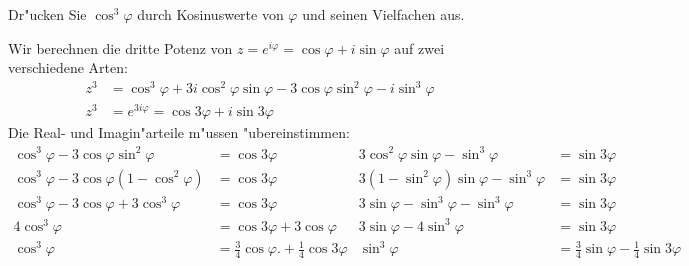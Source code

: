 Dr"ucken Sie $\cos^3\varphi$ durch Kosinuswerte von $\varphi$ und seinen
Vielfachen aus.

\begin{loesung}
Wir berechnen die dritte Potenz von $z=e^{i\varphi}=\cos\varphi+i\sin\varphi$
auf zwei verschiedene Arten:
\begin{align*}
z^3
&=
\cos^3\varphi + 3i\cos^2\varphi\sin\varphi - 3 \cos\varphi\sin^2\varphi
-i\sin^3\varphi
\\
z^3
&=
e^{3i\varphi}=\cos3\varphi+i\sin3\varphi
\end{align*}
Die Real- und Imagin"arteile m"ussen "ubereinstimmen:
\begin{align*}
\cos^3\varphi-3\cos\varphi\sin^2\varphi
&=
\cos3\varphi
&
3\cos^2\varphi\sin\varphi-\sin^3\varphi
&=
\sin3\varphi
\\
\cos^3\varphi-3\cos\varphi(1-\cos^2\varphi)
&=
\cos3\varphi
&
3(1-\sin^2\varphi)\sin\varphi-\sin^3\varphi
&=
\sin3\varphi
\\
\cos^3\varphi-3\cos\varphi + 3\cos^3\varphi
&=
\cos3\varphi
&
3\sin\varphi -\sin^3\varphi-\sin^3\varphi
&=
\sin3\varphi
\\
4\cos^3\varphi
&=
\cos3\varphi
+
3\cos\varphi
&
3\sin\varphi -4\sin^3\varphi
&=
\sin3\varphi
\\
\cos^3\varphi
&=
\frac34 \cos\varphi.
+
\frac14 \cos3\varphi
&
\sin^3\varphi
&=
\frac34 \sin\varphi
-
\frac14\sin3\varphi
\end{align*}
\end{loesung}

